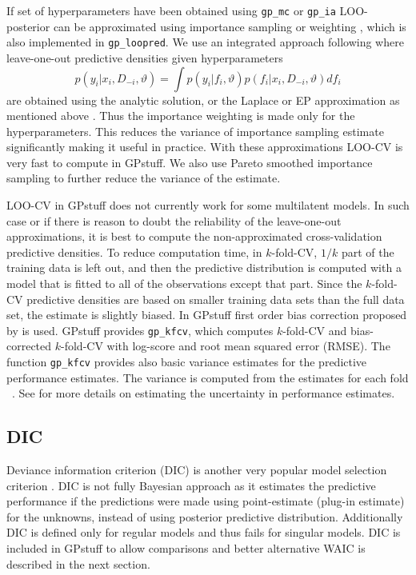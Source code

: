 \documentclass[twoside,11pt]{article}
\newcommand{\pkg}[1]{{\fontseries{b}\selectfont #1}}
\newcommand{\code}[1]{{\normalfont\texttt{#1}}}
\begin{document}
If set of hyperparameters have been obtained using \code{gp\_mc} or
\code{gp\_ia} LOO-posterior can be approximated using importance
sampling or weighting
\citep{Gelfand+Dey+Chang:1992,Vehtari+Lampinen:2002}, which is also
implemented in \code{gp\_loopred}. We use an integrated approach following \citet[][p. 40]{Vehtari:2001} where leave-one-out
predictive densities given hyperparameters
\begin{equation}
p(y_i|x_i,D_{-i},\vartheta)=\int
p(y_i|f_i,\vartheta)p(f_i|x_i,D_{-i},\vartheta)df_i 
\end{equation}
are obtained using the analytic solution, or the Laplace or EP
approximation as mentioned above \citep[see
also][]{Held+Schrodle+Rue:2010}. Thus the importance weighting is made
only for the hyperparameters. This reduces the variance of importance
sampling estimate significantly making it useful in practice. With
these approximations LOO-CV is very fast to compute in GPstuff. We
also use Pareto smoothed importance sampling
\citep{Vehtari+Gelman:2015,Vehtari+Gelman+Gabry:2015} to further
reduce the variance of the estimate.

LOO-CV in GPstuff does not currently work for some multilatent
models. In such case or if there is reason to doubt the reliability of
the leave-one-out approximations, it is best to compute the non-approximated
cross-validation predictive densities.  To reduce computation time, in
$k$-fold-CV, $1/k$ part of the training data is left out, and then the
predictive distribution is computed with a model that is fitted to all
of the observations except that part.  Since the $k$-fold-CV
predictive densities are based on smaller training data sets than the
full data set, the estimate is slightly biased. In \pkg{GPstuff} first
order bias correction proposed by \citet{Burman:1989} is used.
\pkg{GPstuff} provides \code{gp\_kfcv}, which computes $k$-fold-CV and
bias-corrected $k$-fold-CV with log-score and root mean squared error
(RMSE). The function \code{gp\_kfcv} provides also basic variance
estimates for the predictive performance estimates.  The variance is
computed from the estimates for each fold ~\citep[see,
e.g.,][]{Dietterich:1998}.  See
\citet{Vehtari+Lampinen:2002,Vehtari+Ojanen:2012} for more details on
estimating the uncertainty in performance estimates.

\subsection{DIC}

Deviance information criterion (DIC) is another very popular model
selection criterion
\citep[][]{Spiegelhalter+Best+Carlin+Linde:2002}. DIC is not fully
Bayesian approach as it estimates the predictive performance if the
predictions were made using point-estimate (plug-in estimate) for
the unknowns, instead of using posterior predictive distribution.
Additionally DIC is defined only for regular models and thus fails
for singular models. DIC is included in \pkg{GPstuff} to allow
comparisons and better alternative WAIC is described in the next
section.
\end{document}

